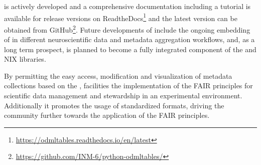  is actively developed and a comprehensive documentation including a tutorial is available for release versions on ReadtheDocs\footnote{\url{https://odmltables.readthedocs.io/en/latest}} and the latest version can be obtained from GitHub\footnote{\url{https://github.com/INM-6/python-odmltables/}}. Future developments of  include the ongoing embedding of  in different neuroscientific data and metadata aggregation workflows, and, as a long term prospect,  is planned to become a fully integrated component of the  and NIX libraries.

By permitting the easy access, modification and visualization of metadata collections based on the ,  facilities the implementation of the FAIR principles for scientific data management and stewardship \citep{Wilkinson_2016} in an experimental environment. Additionally it promotes the usage of standardized formats, driving the community further towards the application of the FAIR principles.
